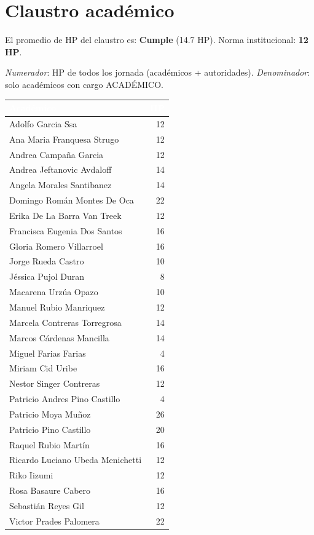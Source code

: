 \documentclass[11pt, a4paper]{article}
\begin{document}
\section{Claustro académico}

El promedio de HP del claustro es: \textcolor{green!60!black}{\textbf{Cumple}} (14.7 HP). Norma institucional: \textbf{12 HP}.

\textit{Numerador}: HP de todos los jornada (académicos + autoridades). \textit{Denominador}: solo académicos con cargo ACADÉMICO.

\begin{tabular}{lr}
\toprule
\rowcolor{usachDark} \textbf{\textcolor{white}{Académico}} & \textbf{\textcolor{white}{HP}} \\
\midrule
Adolfo Garcia Ssa & 12 \\
\rowcolor{rowEven}Ana Maria Franquesa Strugo & 12 \\
Andrea Campaña Garcia & 12 \\
\rowcolor{rowEven}Andrea Jeftanovic Avdaloff & 14 \\
Angela Morales Santibanez & 14 \\
\rowcolor{rowEven}Domingo Román Montes De Oca & 22 \\
Erika De La Barra Van Treek & 12 \\
\rowcolor{rowEven}Francisca Eugenia Dos Santos & 16 \\
Gloria Romero Villarroel & 16 \\
\rowcolor{rowEven}Jorge Rueda Castro & 10 \\
Jéssica Pujol Duran & 8 \\
\rowcolor{rowEven}Macarena Urzúa Opazo & 10 \\
Manuel Rubio Manriquez & 12 \\
\rowcolor{rowEven}Marcela Contreras Torregrosa & 14 \\
Marcos Cárdenas Mancilla & 14 \\
\rowcolor{rowEven}Miguel Farias Farias & 4 \\
Miriam Cid Uribe & 16 \\
\rowcolor{rowEven}Nestor Singer Contreras & 12 \\
Patricio Andres Pino Castillo & 4 \\
\rowcolor{rowEven}Patricio Moya Muñoz & 26 \\
Patricio Pino Castillo & 20 \\
\rowcolor{rowEven}Raquel Rubio Martín & 16 \\
Ricardo Luciano Ubeda Menichetti & 12 \\
\rowcolor{rowEven}Riko Iizumi & 12 \\
Rosa Basaure Cabero & 16 \\
\rowcolor{rowEven}Sebastián Reyes Gil & 12 \\
Victor Prades Palomera & 22 \\
\bottomrule
\end{tabular}
\end{document}
